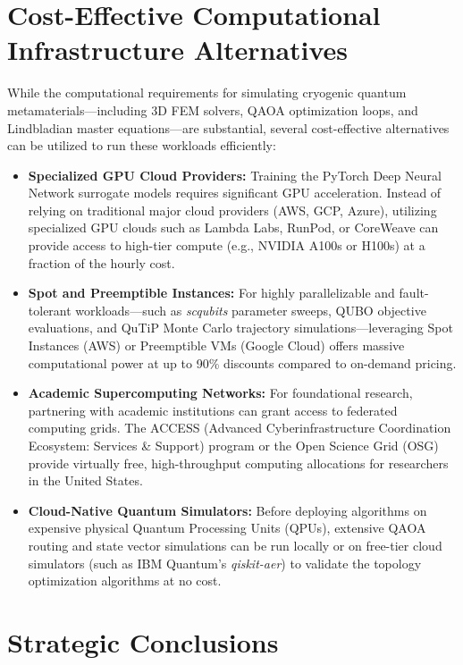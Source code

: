 \documentclass[11pt, a4paper]{article}
\begin{document}
\section*{Cost-Effective Computational Infrastructure Alternatives}

While the computational requirements for simulating cryogenic quantum metamaterials---including 3D FEM solvers, QAOA optimization loops, and Lindbladian master equations---are substantial, several cost-effective alternatives can be utilized to run these workloads efficiently:

\begin{itemize}
    \item \textbf{Specialized GPU Cloud Providers:} Training the PyTorch Deep Neural Network surrogate models requires significant GPU acceleration. Instead of relying on traditional major cloud providers (AWS, GCP, Azure), utilizing specialized GPU clouds such as Lambda Labs, RunPod, or CoreWeave can provide access to high-tier compute (e.g., NVIDIA A100s or H100s) at a fraction of the hourly cost.
    \item \textbf{Spot and Preemptible Instances:} For highly parallelizable and fault-tolerant workloads---such as \textit{scqubits} parameter sweeps, QUBO objective evaluations, and QuTiP Monte Carlo trajectory simulations---leveraging Spot Instances (AWS) or Preemptible VMs (Google Cloud) offers massive computational power at up to 90\% discounts compared to on-demand pricing.
    \item \textbf{Academic Supercomputing Networks:} For foundational research, partnering with academic institutions can grant access to federated computing grids. The ACCESS (Advanced Cyberinfrastructure Coordination Ecosystem: Services \& Support) program or the Open Science Grid (OSG) provide virtually free, high-throughput computing allocations for researchers in the United States.
    \item \textbf{Cloud-Native Quantum Simulators:} Before deploying algorithms on expensive physical Quantum Processing Units (QPUs), extensive QAOA routing and state vector simulations can be run locally or on free-tier cloud simulators (such as IBM Quantum's \textit{qiskit-aer}) to validate the topology optimization algorithms at no cost.
\end{itemize}

\section{Strategic Conclusions}
\end{document}
